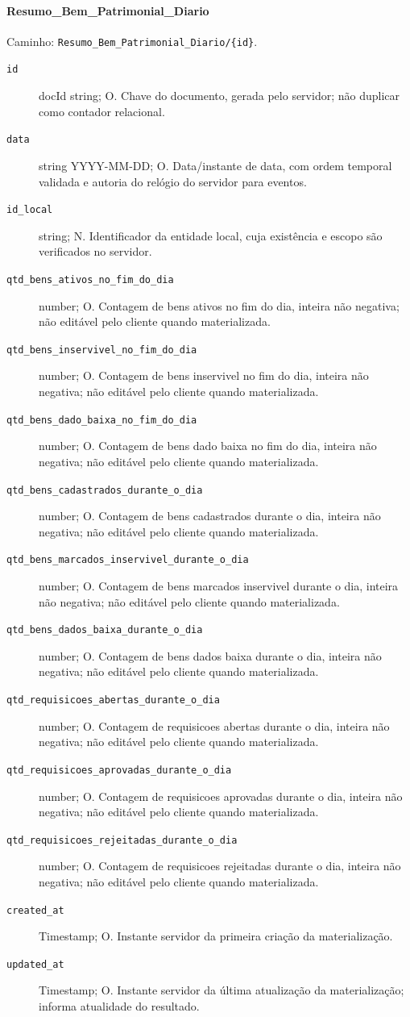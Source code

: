 \paragraph{Resumo\_Bem\_Patrimonial\_Diario}\mbox{}\par
Caminho: \texttt{Resumo\_Bem\_Patrimonial\_Diario/\{id\}}.
\begin{description}
\item[\texttt{id}] docId string; O. Chave do documento, gerada pelo servidor; não duplicar como contador relacional.
\item[\texttt{data}] string YYYY-MM-DD; O. Data/instante de data, com ordem temporal validada e autoria do relógio do servidor para eventos.
\item[\texttt{id\_local}] string; N. Identificador da entidade local, cuja existência e escopo são verificados no servidor.
\item[\texttt{qtd\_bens\_ativos\_no\_fim\_do\_dia}] number; O. Contagem de bens ativos no fim do dia, inteira não negativa; não editável pelo cliente quando materializada.
\item[\texttt{qtd\_bens\_inservivel\_no\_fim\_do\_dia}] number; O. Contagem de bens inservivel no fim do dia, inteira não negativa; não editável pelo cliente quando materializada.
\item[\texttt{qtd\_bens\_dado\_baixa\_no\_fim\_do\_dia}] number; O. Contagem de bens dado baixa no fim do dia, inteira não negativa; não editável pelo cliente quando materializada.
\item[\texttt{qtd\_bens\_cadastrados\_durante\_o\_dia}] number; O. Contagem de bens cadastrados durante o dia, inteira não negativa; não editável pelo cliente quando materializada.
\item[\texttt{qtd\_bens\_marcados\_inservivel\_durante\_o\_dia}] number; O. Contagem de bens marcados inservivel durante o dia, inteira não negativa; não editável pelo cliente quando materializada.
\item[\texttt{qtd\_bens\_dados\_baixa\_durante\_o\_dia}] number; O. Contagem de bens dados baixa durante o dia, inteira não negativa; não editável pelo cliente quando materializada.
\item[\texttt{qtd\_requisicoes\_abertas\_durante\_o\_dia}] number; O. Contagem de requisicoes abertas durante o dia, inteira não negativa; não editável pelo cliente quando materializada.
\item[\texttt{qtd\_requisicoes\_aprovadas\_durante\_o\_dia}] number; O. Contagem de requisicoes aprovadas durante o dia, inteira não negativa; não editável pelo cliente quando materializada.
\item[\texttt{qtd\_requisicoes\_rejeitadas\_durante\_o\_dia}] number; O. Contagem de requisicoes rejeitadas durante o dia, inteira não negativa; não editável pelo cliente quando materializada.
\item[\texttt{created\_at}] Timestamp; O. Instante servidor da primeira criação da materialização.
\item[\texttt{updated\_at}] Timestamp; O. Instante servidor da última atualização da materialização; informa atualidade do resultado.
\end{description}

